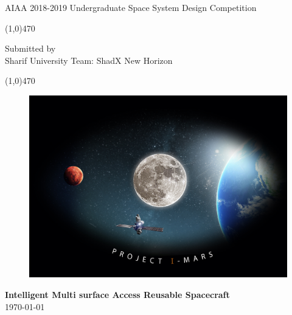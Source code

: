 \documentclass[openright,10pt,onecolumn]{report}
\begin{document}
\LARGE

\thispagestyle{empty}
\begin{centering}


  {\color{white}AIAA 2018-2019 Undergraduate Space System Design Competition}
  \begin{center}
    {\color{white}\line(1,0){470}} 
   \end{center}
   
  {\color{white}Submitted by}\\
 
  {\color{white}Sharif University Team: ShadX New Horizon}
  \begin{center}
    {\color{white}\line(1,0){470}} 
   \end{center}
     
  \begin{figure}[hbtp]   
    \centering
    {\includegraphics[width=\linewidth]{First_page}}
  \end{figure}
  \pagecolor{black}\afterpage{\nopagecolor}
  
  
  {\color{white}\textbf{Intelligent Multi surface Access Reusable Spacecraft}}\\
  
  {\color{white}\today}  

\end{centering}



\normalsize
\newpage%
\end{document}
